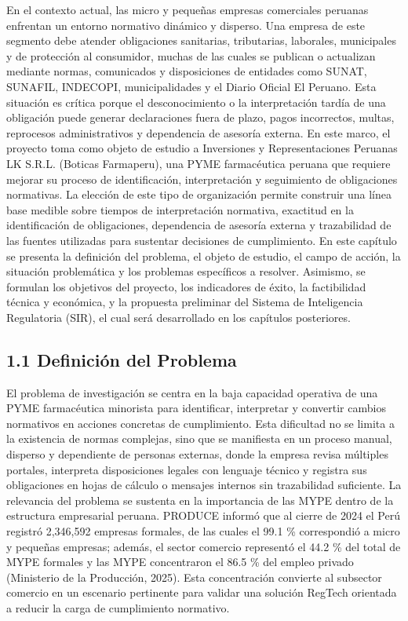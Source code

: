 \documentclass[12pt,a4paper,oneside]{report}
\begin{document}
En el contexto actual, las micro y pequeñas empresas comerciales
peruanas enfrentan un entorno normativo dinámico y disperso. Una empresa
de este segmento debe atender obligaciones sanitarias, tributarias,
laborales, municipales y de protección al consumidor, muchas de las
cuales se publican o actualizan mediante normas, comunicados y
disposiciones de entidades como SUNAT, SUNAFIL, INDECOPI,
municipalidades y el Diario Oficial El Peruano. Esta situación es
crítica porque el desconocimiento o la interpretación tardía de una
obligación puede generar declaraciones fuera de plazo, pagos
incorrectos, multas, reprocesos administrativos y dependencia de
asesoría externa. En este marco, el proyecto toma como objeto de estudio
a Inversiones y Representaciones Peruanas LK S.R.L. (Boticas Farmaperu),
una PYME farmacéutica peruana que requiere mejorar su proceso de
identificación, interpretación y seguimiento de obligaciones normativas.
La elección de este tipo de organización permite construir una línea
base medible sobre tiempos de interpretación normativa, exactitud en la
identificación de obligaciones, dependencia de asesoría externa y
trazabilidad de las fuentes utilizadas para sustentar decisiones de
cumplimiento. En este capítulo se presenta la definición del problema,
el objeto de estudio, el campo de acción, la situación problemática y
los problemas específicos a resolver. Asimismo, se formulan los
objetivos del proyecto, los indicadores de éxito, la factibilidad
técnica y económica, y la propuesta preliminar del Sistema de
Inteligencia Regulatoria (SIR), el cual será desarrollado en los
capítulos posteriores.

\subsection{1.1 Definición del
Problema}\label{definiciuxf3n-del-problema}

El problema de investigación se centra en la baja capacidad operativa de
una PYME farmacéutica minorista para identificar, interpretar y
convertir cambios normativos en acciones concretas de cumplimiento. Esta
dificultad no se limita a la existencia de normas complejas, sino que se
manifiesta en un proceso manual, disperso y dependiente de personas
externas, donde la empresa revisa múltiples portales, interpreta
disposiciones legales con lenguaje técnico y registra sus obligaciones
en hojas de cálculo o mensajes internos sin trazabilidad suficiente. La
relevancia del problema se sustenta en la importancia de las MYPE dentro
de la estructura empresarial peruana. PRODUCE informó que al cierre de
2024 el Perú registró 2,346,592 empresas formales, de las cuales el 99.1
\% correspondió a micro y pequeñas empresas; además, el sector comercio
representó el 44.2 \% del total de MYPE formales y las MYPE concentraron
el 86.5 \% del empleo privado (Ministerio de la Producción, 2025). Esta
concentración convierte al subsector comercio en un escenario pertinente
para validar una solución RegTech orientada a reducir la carga de
cumplimiento normativo.
\end{document}
